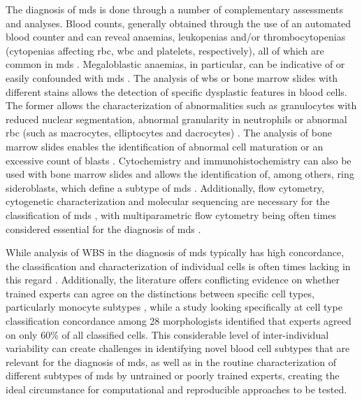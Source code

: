 The diagnosis of \ac{mds} is done through a number of complementary assessments and analyses. Blood counts, generally obtained through the use of an automated blood counter and can reveal anaemias, leukopenias and/or thrombocytopenias (cytopenias affecting \ac{rbc}, \ac{wbc} and platelets, respectively), all of which are common in \ac{mds} \cite{Najean1989-qm,Campo2017-wi}. Megaloblastic anaemias, in particular, can be indicative of or easily confounded with \ac{mds} \cite{Kaferle2009-pl,Vasekova2016-vo,Corey2007-cs}. The analysis of \ac{wbs} or bone marrow slides with different stains allows the detection of specific dysplastic features in blood cells. The former allows the characterization of abnormalities such as granulocytes with reduced nuclear segmentation, abnormal granularity in neutrophils or abnormal \ac{rbc} (such as macrocytes, elliptocytes and dacrocytes) \cite{Campo2017-wi,Langenhuijsen1984-qx,Kuriyama1986-ts,Davey1988-zn}. The analysis of bone marrow slides enables the identification of abnormal cell maturation or an excessive count of blasts \cite{Aster2020-cu}. Cytochemistry and immunohistochemistry can also be used with bone marrow slides and allows the identification of, among others, ring sideroblasts, which define a subtype of \ac{mds} \cite{Campo2017-wi,Mufti2008-ye}. Additionally, flow cytometry, cytogenetic characterization and molecular sequencing are necessary for the classification of \ac{mds} \cite{Aster2020-cu,Porwit2014-zi,Greenberg2012-en}, with multiparametric flow cytometry being often times considered essential for the diagnosis of \ac{mds} \cite{Cremers2016-fs}.

While analysis of WBS in the diagnosis of \ac{mds} typically has high concordance, the classification and characterization of individual cells is often times lacking in this regard \cite{De_Swart2017-wc,Howe2004-mn}. Additionally, the literature offers conflicting evidence on whether trained experts can agree on the distinctions between specific cell types, particularly monocyte subtypes \cite{Goasguen2009-dn,Foucar2020-uz}, while a study looking specifically at cell type classification concordance among 28 morphologists identified that experts agreed on only 60\% of all classified cells. This considerable level of inter-individual variability can create challenges in identifying novel blood cell subtypes that are relevant for the diagnosis of \ac{mds}, as well as in the routine characterization of different subtypes of \ac{mds} by untrained or poorly trained experts, creating the ideal circumstance for computational and reproducible approaches to be tested.

